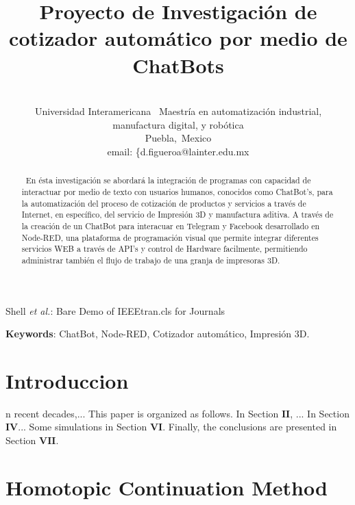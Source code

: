 \documentclass[conference]{IEEEtran}
\begin{document}
\title{Proyecto de Investigación de cotizador automático por medio de ChatBots}
\author
{
\\
\IEEEauthorblockA
{
	Universidad Interamericana~ Maestría en automatización industrial, \\manufactura 		digital, y robótica\\
	Puebla,~Mexico \\
	email: \{d.figueroa@lainter.edu.mx}
}



\markboth{}%
{Shell \MakeLowercase{\textit{et al.}}: Bare Demo of IEEEtran.cls for Journals}

\maketitle


 
\begin{abstract}
 ~En ésta investigación se abordará la integración de programas con capacidad de interactuar por medio de texto con usuarios humanos, conocidos como ChatBot's, para la automatización del proceso de cotización de productos y servicios a través de Internet, en específico, del servicio de Impresión 3D y manufactura aditiva. A través de la creación de un ChatBot para interacuar en Telegram y Facebook desarrollado en Node-RED, una plataforma de programación visual que permite integrar diferentes servicios WEB a través de API's y control de Hardware facilmente, permitiendo administrar también el flujo de trabajo de una granja de impresoras 3D.
\end{abstract}
\vspace{0.5cm}
\textbf{Keywords}:  ChatBot, Node-RED, Cotizador automático, Impresión 3D.

\IEEEpeerreviewmaketitle
\section{Introduccion}
n recent decades,... This paper is organized as follows. In Section $\mathbf{II}$, ... In Section $\mathbf{IV}$... Some simulations in Section $\mathbf{VI}$. Finally, the conclusions are presented in Section $\mathbf{VII}$.

\section{Homotopic Continuation Method}
\end{document}
